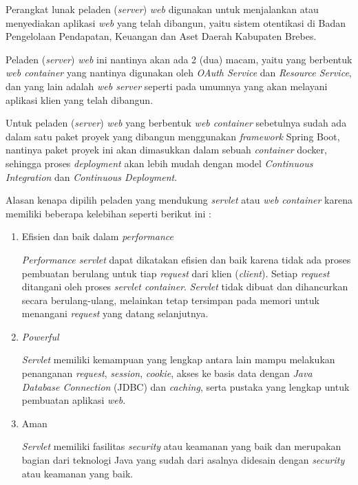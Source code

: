 \documentclass[pdftex,12pt, oneside]{article}
\begin{document}
\begin{enumerate}
Perangkat lunak peladen (\textit{server}) \textit{web} digunakan untuk menjalankan atau menyediakan aplikasi \textit{web} yang telah dibangun, yaitu sistem otentikasi di Badan Pengelolaan Pendapatan, Keuangan dan Aset Daerah Kabupaten Brebes.

Peladen (\textit{server}) \textit{web} ini nantinya akan ada 2 (dua) macam, yaitu yang berbentuk \textit{web container} yang nantinya digunakan oleh \textit{OAuth Service} dan \textit{Resource Service}, dan yang lain adalah \textit{web server} seperti pada umumnya yang akan melayani aplikasi klien yang telah dibangun.

Untuk peladen (\textit{server}) \textit{web} yang berbentuk \textit{web container} sebetulnya sudah ada dalam satu paket proyek yang dibangun menggunakan \textit{framework} Spring Boot, nantinya paket proyek ini akan dimasukkan dalam sebuah \textit{container} docker, sehingga proses \textit{deployment} akan lebih mudah dengan model \textit{Continuous Integration} dan \textit{Continuous Deployment}.

Alasan kenapa dipilih peladen yang mendukung \textit{servlet} atau \textit{web container} karena memiliki beberapa kelebihan seperti berikut ini :

	\begin{enumerate}
		\item Efisien dan baik dalam \textit{performance}
		
\textit{Performance servlet} dapat dikatakan efisien dan baik karena tidak ada proses pembuatan berulang untuk tiap \textit{request} dari klien (\textit{client}). Setiap \textit{request} ditangani oleh proses \textit{servlet container}. \textit{Servlet} tidak dibuat dan dihancurkan secara berulang-ulang, melainkan tetap tersimpan pada memori untuk menangani \textit{request} yang datang selanjutnya.

		\item \textit{Powerful}

\textit{Servlet} memiliki kemampuan yang lengkap antara lain mampu melakukan penanganan \textit{request}, \textit{session}, \textit{cookie}, akses ke basis data dengan \textit{Java Database Connection} (JDBC) dan \textit{caching}, serta pustaka yang lengkap untuk pembuatan aplikasi \textit{web}.
	
		\item Aman
		
\textit{Servlet} memiliki fasilitas \textit{security} atau keamanan yang baik dan merupakan bagian dari teknologi Java yang sudah dari asalnya didesain dengan \textit{security} atau keamanan yang baik.		
		

\end{enumerate}
\end{enumerate}
\end{document}
